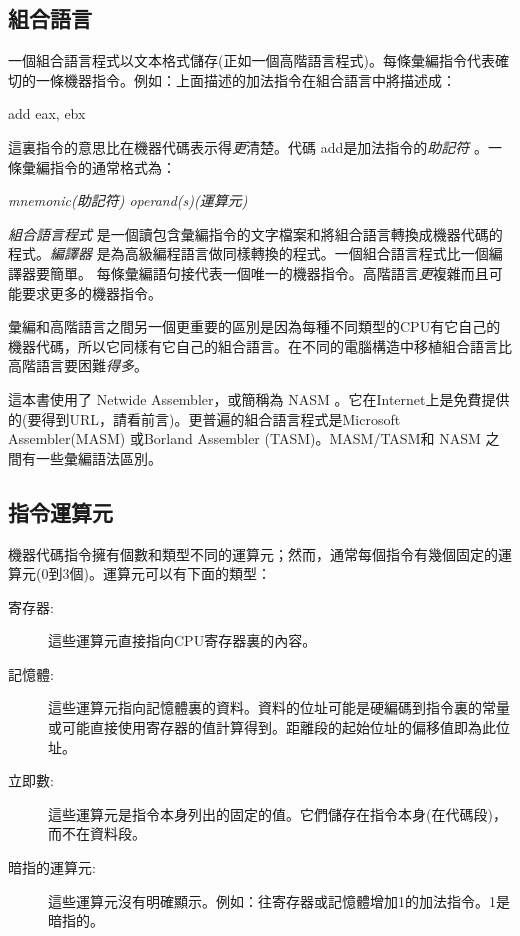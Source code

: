 \subsection{組合語言}

一個組合語言程式以文本格式儲存(正如一個高階語言程式)。每條彙編指令代表確切的一條機器指令。例如：上面描述的加法指令在組合語言中將描述成：
\begin{CodeQuote}
   add eax, ebx
\end{CodeQuote}
這裏指令的意思比在機器代碼表示得\emph{更}清楚。代碼{\code
add}是加法指令的\emph{助記符}
。一條彙編指令的通常格式為：
\begin{CodeQuote}
  {\em mnemonic(助記符) operand(s)(運算元)}
\end{CodeQuote}

\emph{組合語言程式}
是一個讀包含彙編指令的文字檔案和將組合語言轉換成機器代碼的程式。\emph{編譯器}
是為高級編程語言做同樣轉換的程式。一個組合語言程式比一個編譯器要簡單。
每條彙編語句接代表一個唯一的機器指令。高階語言\emph{更}複雜而且可能要求更多的機器指令。

彙編和高階語言之間另一個更重要的區別是因為每種不同類型的CPU有它自己的機器代碼，所以它同樣有它自己的組合語言。在不同的電腦構造中移植組合語言比高階語言要困難\emph{得多}。

這本書使用了 Netwide Assembler，或簡稱為 NASM
。它在Internet上是免費提供的(要得到URL，請看前言)。更普遍的組合語言程式是Microsoft
Assembler(MASM) 或Borland Assembler
(TASM)。MASM/TASM和 NASM 之間有一些彙編語法區別。

\subsection{指令運算元}

機器代碼指令擁有個數和類型不同的運算元；然而，通常每個指令有幾個固定的運算元(0到3個)。運算元可以有下面的類型：
\begin{description}
\item[寄存器:]
這些運算元直接指向CPU寄存器裏的內容。
\item[記憶體:]
這些運算元指向記憶體裏的資料。資料的位址可能是硬編碼到指令裏的常量或可能直接使用寄存器的值計算得到。距離段的起始位址的偏移值即為此位址。
\item[立即數:]
這些運算元是指令本身列出的固定的值。它們儲存在指令本身(在代碼段)，而不在資料段。
\item[暗指的運算元:]
這些運算元沒有明確顯示。例如：往寄存器或記憶體增加1的加法指令。1是暗指的。
\end{description}

